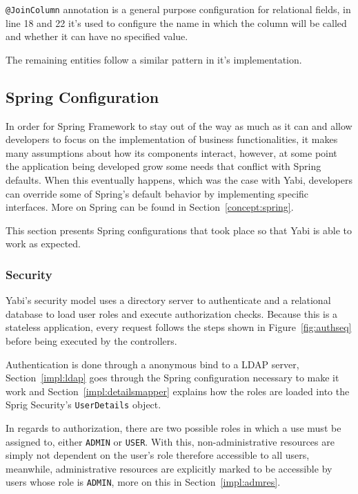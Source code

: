 \texttt{@JoinColumn} annotation is a general purpose configuration for relational fields, in line 18 and 22 it's used to configure the name in which the column will be called and whether it can have no specified value.



The remaining entities follow a similar pattern in it's implementation.

\subsection{Spring Configuration}
In order for Spring Framework to stay out of the way as much as it can and allow developers to focus on the implementation of business functionalities, it makes many assumptions about how its components interact, however, at some point the application being developed grow some needs that conflict with Spring defaults. When this eventually happens, which was the case with \gls{Yabi}, developers can override some of Spring's default behavior by implementing specific interfaces. More on Spring can be found in Section~\ref{concept:spring}.

This section presents Spring configurations that took place so that \gls{Yabi} is able to work as expected.

\subsubsection{Security}
\gls{Yabi}'s security model uses a directory server to authenticate and a relational database to load user roles and execute authorization checks. Because this is a stateless application, every request follows the steps shown in Figure~\ref{fig:authseq} before being executed by the controllers.

Authentication is done through a anonymous bind to a \gls{LDAP} server, Section~\ref{impl:ldap} goes through the Spring configuration necessary to make it work and Section~\ref{impl:detailsmapper} explains how the roles are loaded into the Sprig Security's \texttt{UserDetails} object.

In regards to authorization, there are two possible roles in which a use must be assigned to, either \texttt{ADMIN} or \texttt{USER}. With this, non-administrative resources are simply not dependent on the user's role therefore accessible to all users, meanwhile, administrative resources are explicitly marked to be accessible by users whose role is \texttt{ADMIN}, more on this in Section~\ref{impl:admres}.

